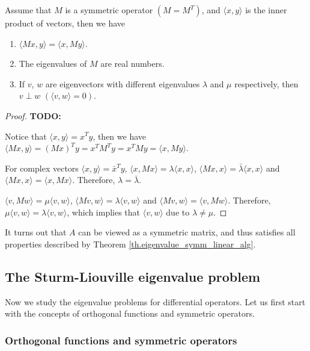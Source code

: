 \begin{theorem}[]\label{th.eigenvalue_symm_linear_alg} Assume that $M$ is a symmetric operator $(M = M^{T})$, and $\langle x, y\rangle$ is the inner product of vectors, then we have
\begin{enumerate}
    \item $\langle M x, y\rangle = \langle x, My\rangle$.
    \item The eigenvalues of $M$ are real numbers.
    \item If $v$, $w$ are eigenvectors with different eigenvalues $\lambda$ and $\mu$ respectively, then $v\perp w$ $(\langle v, w\rangle = 0)$.
\end{enumerate}
\end{theorem}
\begin{proof}
    \textbf{TODO: }

    Notice that $\langle x, y\rangle = x^T y$, then we have $\langle M x, y\rangle = (M x)^T y = x^T M^T y = x^T M y = \langle x, My\rangle$.

    For complex vectors $\langle x, y\rangle = \bar{x}^T y$, $\langle x, M x\rangle = \lambda\langle x, x\rangle$, $\langle M x, x\rangle = \bar{\lambda}\langle x, x\rangle$ and $\langle M x, x\rangle = \langle x, Mx\rangle$. Therefore, $\lambda = \bar{\lambda}$. 

    $\langle v, M w\rangle = \mu\langle v, w\rangle$, $\langle M v, w\rangle = \lambda\langle v, w\rangle$ and $\langle M v, w\rangle = \langle v, Mw\rangle$. Therefore, $\mu\langle v, w\rangle = \lambda \langle v, w\rangle$, which implies that $\langle v, w\rangle$ due to $\lambda\neq\mu$.
\end{proof}


It turns out that $A$ can be viewed as a symmetric matrix, and thus satisfies all properties described by Theorem \ref{th.eigenvalue_symm_linear_alg}.


\subsection{The Sturm-Liouville eigenvalue problem}

Now we study the eigenvalue problems for differential operators. Let us first start with the concepts of orthogonal functions and symmetric operators.

\subsubsection{Orthogonal functions and symmetric operators}

